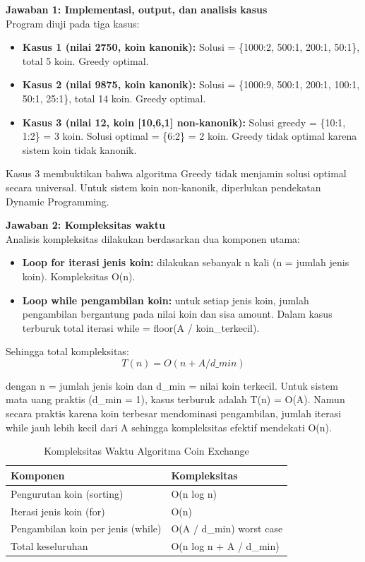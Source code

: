 \textbf{Jawaban 1: Implementasi, output, dan analisis kasus}\\
Program diuji pada tiga kasus:
\begin{itemize}
    \item \textbf{Kasus 1 (nilai 2750, koin kanonik):} Solusi = \{1000:2, 500:1, 200:1, 50:1\}, total 5 koin. Greedy optimal.
    \item \textbf{Kasus 2 (nilai 9875, koin kanonik):} Solusi = \{1000:9, 500:1, 200:1, 100:1, 50:1, 25:1\}, total 14 koin. Greedy optimal.
    \item \textbf{Kasus 3 (nilai 12, koin [10,6,1] non-kanonik):} Solusi greedy = \{10:1, 1:2\} = 3 koin. Solusi optimal = \{6:2\} = 2 koin. Greedy tidak optimal karena sistem koin tidak kanonik.
\end{itemize}

Kasus 3 membuktikan bahwa algoritma Greedy tidak menjamin solusi optimal secara universal. Untuk sistem koin non-kanonik, diperlukan pendekatan Dynamic Programming.

\textbf{Jawaban 2: Kompleksitas waktu}\\
Analisis kompleksitas dilakukan berdasarkan dua komponen utama:
\begin{itemize}
    \item \textbf{Loop for iterasi jenis koin:} dilakukan sebanyak n kali (n = jumlah jenis koin). Kompleksitas O(n).
    \item \textbf{Loop while pengambilan koin:} untuk setiap jenis koin, jumlah pengambilan bergantung pada nilai koin dan sisa amount. Dalam kasus terburuk total iterasi while = floor(A / koin\_terkecil).
\end{itemize}

Sehingga total kompleksitas:
\[ T(n) = O(n + A / d\_min) \]

dengan n = jumlah jenis koin dan d\_min = nilai koin terkecil. Untuk sistem mata uang praktis (d\_min = 1), kasus terburuk adalah T(n) = O(A). Namun secara praktis karena koin terbesar mendominasi pengambilan, jumlah iterasi while jauh lebih kecil dari A sehingga kompleksitas efektif mendekati O(n).

\begin{table}[H]
    \centering
    \caption{Kompleksitas Waktu Algoritma Coin Exchange}
    \begin{tabular}{ll}
    \toprule
    \textbf{Komponen} & \textbf{Kompleksitas} \\ \midrule
    Pengurutan koin (sorting) & O(n log n) \\
    Iterasi jenis koin (for) & O(n) \\
    Pengambilan koin per jenis (while) & O(A / d\_min) worst case \\
    \midrule
    Total keseluruhan & O(n log n + A / d\_min) \\ \bottomrule
    \end{tabular}
\end{table}